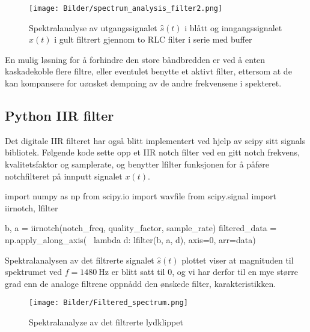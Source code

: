 \begin{figure}[H]
    \centering
    \texttt{[image: Bilder/spectrum\_analysis\_filter2.png]}
    \caption{Spektralanalyse av utgangssignalet $\hat{s}(t)$ i blått og inngangssignalet $x(t)$ i gult filtrert gjennom to RLC filter i serie med buffer}
\end{figure}

En mulig løsning for å forhindre den store båndbredden er ved å enten kaskadekoble flere filtre, eller eventulet benytte et aktivt filter, ettersom at de kan kompansere 
for uønsket dempning av de andre frekvensene i spekteret.

\subsection{Python IIR filter}
Det digitale IIR filteret har også blitt implementert ved hjelp av scipy sitt signals bibliotek. Følgende kode sette opp et IIR notch filter ved en gitt notch frekvens,
kvalitetsfaktor og samplerate, og benytter lfilter funksjonen for å påføre notchfilteret på innputt signalet $x(t)$.
\begin{pythoncode}
import numpy as np
from scipy.io import wavfile
from scipy.signal import iirnotch, lfilter

b, a = iirnotch(notch_freq, quality_factor, sample_rate)
filtered_data = np.apply_along_axis( \ 
                    lambda d: lfilter(b, a, d), axis=0, arr=data)
\end{pythoncode}

Spektralanalysen av det filtrerte signalet $\hat{s}(t)$ plottet viser 
at magnituden til spektrumet ved $f = \SI{1480}{\hertz}$ er blitt satt til 0, og vi har derfor til en mye større grad enn de analoge filtrene oppnådd den ønskede filter, karakteristikken.
\begin{figure}[H]
    \centering
    \texttt{[image: Bilder/Filtered\_spectrum.png]}
    \caption{Spektralanalyze av det filtrerte lydklippet}
\end{figure}
